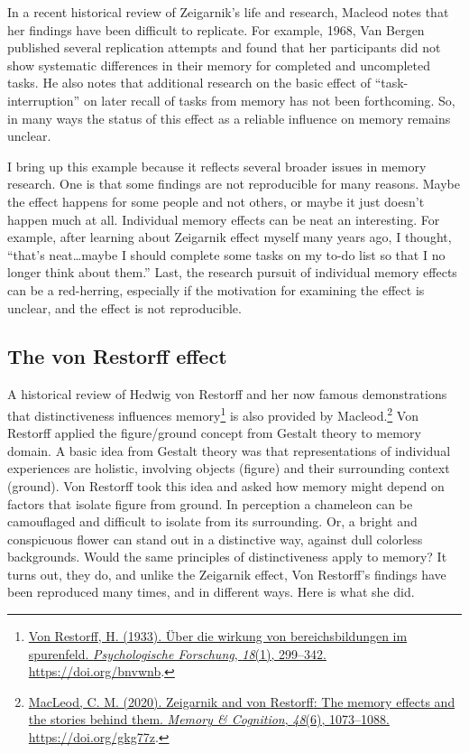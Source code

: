 \documentclass[
  oneside,
  12pt]{crumpbook}
\begin{document}
In a recent historical review of Zeigarnik's life and research, Macleod notes that her findings have been difficult to replicate. For example, 1968, Van Bergen published several replication attempts and found that her participants did not show systematic differences in their memory for completed and uncompleted tasks. He also notes that additional research on the basic effect of ``task-interruption'' on later recall of tasks from memory has not been forthcoming. So, in many ways the status of this effect as a reliable influence on memory remains unclear.

I bring up this example because it reflects several broader issues in memory research. One is that some findings are not reproducible for many reasons. Maybe the effect happens for some people and not others, or maybe it just doesn't happen much at all. Individual memory effects can be neat an interesting. For example, after learning about Zeigarnik effect myself many years ago, I thought, ``that's neat\ldots maybe I should complete some tasks on my to-do list so that I no longer think about them.'' Last, the research pursuit of individual memory effects can be a red-herring, especially if the motivation for examining the effect is unclear, and the effect is not reproducible.

\hypertarget{the-von-restorff-effect}{%
\subsection{The von Restorff effect}\label{the-von-restorff-effect}}

A historical review of Hedwig von Restorff and her now famous demonstrations that distinctiveness influences memory\footnote{\protect\hyperlink{ref-vonrestorffUberWirkungBereichsbildungen1933}{Von Restorff, H. (1933). Über die wirkung von bereichsbildungen im spurenfeld. \emph{Psychologische Forschung}, \emph{18}(1), 299--342. \url{https://doi.org/bnvwnb}}.} is also provided by Macleod.\footnote{\protect\hyperlink{ref-macleodZeigarnikRestorffMemory2020}{MacLeod, C. M. (2020). Zeigarnik and von {Restorff}: {The} memory effects and the stories behind them. \emph{Memory \& Cognition}, \emph{48}(6), 1073--1088. \url{https://doi.org/gkg77z}}.} Von Restorff applied the figure/ground concept from Gestalt theory to memory domain. A basic idea from Gestalt theory was that representations of individual experiences are holistic, involving objects (figure) and their surrounding context (ground). Von Restorff took this idea and asked how memory might depend on factors that isolate figure from ground. In perception a chameleon can be camouflaged and difficult to isolate from its surrounding. Or, a bright and conspicuous flower can stand out in a distinctive way, against dull colorless backgrounds. Would the same principles of distinctiveness apply to memory? It turns out, they do, and unlike the Zeigarnik effect, Von Restorff's findings have been reproduced many times, and in different ways. Here is what she did.
\end{document}
